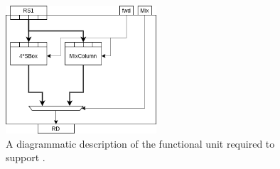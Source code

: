 \newpage

\vspace*{\fill}

\begin{figure}[!h]
\centering
\includegraphics[width={0.5\textwidth}]{diagrams/ise-datapath-v1.png}
\caption{
  A diagrammatic description of the functional unit required to support .
}
\label{fig:v1:fu}
\end{figure}

\vspace*{\fill}

